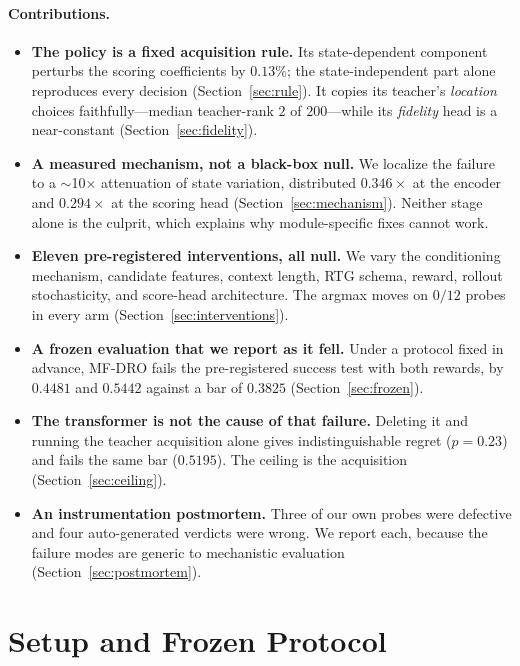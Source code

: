 \documentclass[11pt]{article}
\begin{document}
\paragraph{Contributions.}
\begin{itemize}\itemsep2pt
\item \textbf{The policy is a fixed acquisition rule.} Its state-dependent
component perturbs the scoring coefficients by $0.13\%$; the state-independent
part alone reproduces every decision (Section~\ref{sec:rule}). It copies its
teacher's \emph{location} choices faithfully---median teacher-rank $2$ of
$200$---while its \emph{fidelity} head is a near-constant
(Section~\ref{sec:fidelity}).
\item \textbf{A measured mechanism, not a black-box null.} We localize the
failure to a $\sim$10$\times$ attenuation of state variation, distributed
$0.346\times$ at the encoder and $0.294\times$ at the scoring head
(Section~\ref{sec:mechanism}). Neither stage alone is the culprit, which
explains why module-specific fixes cannot work.
\item \textbf{Eleven pre-registered interventions, all null.} We vary the
conditioning mechanism, candidate features, context length, RTG schema, reward,
rollout stochasticity, and score-head architecture. The argmax moves on $0/12$
probes in every arm (Section~\ref{sec:interventions}).
\item \textbf{A frozen evaluation that we report as it fell.} Under a protocol
fixed in advance, MF-DRO fails the pre-registered success test with both
rewards, by $0.4481$ and $0.5442$ against a bar of $0.3825$
(Section~\ref{sec:frozen}).
\item \textbf{The transformer is not the cause of that failure.} Deleting it and
running the teacher acquisition alone gives indistinguishable regret
($p = 0.23$) and fails the same bar ($0.5195$). The ceiling is the acquisition
(Section~\ref{sec:ceiling}).
\item \textbf{An instrumentation postmortem.} Three of our own probes were
defective and four auto-generated verdicts were wrong. We report each, because
the failure modes are generic to mechanistic evaluation
(Section~\ref{sec:postmortem}).
\end{itemize}

\section{Setup and Frozen Protocol}
\label{sec:setup}
\end{document}
